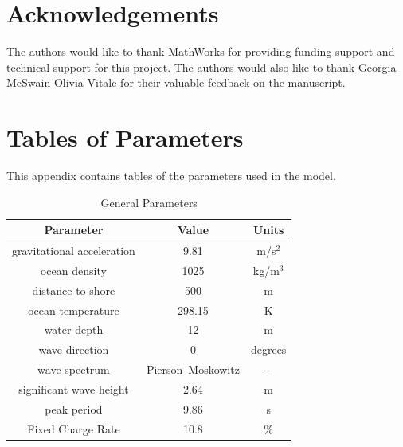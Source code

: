 \documentclass[a4paper,12pt]{elsarticle}
\begin{document}
\section*{Acknowledgements}
The authors would like to thank MathWorks for providing funding support and technical support for this project. The authors would also like to thank Georgia McSwain Olivia Vitale for their valuable feedback on the manuscript.

 
                

\appendix
\newpage
\section{Tables of Parameters} \label{app:params}

This appendix contains tables of the parameters used in the model.

\begin{table}[h]
    \centering
    \caption{General Parameters}
    \begin{tabular}{ccc}
        \hline
        \textbf{Parameter} & \textbf{Value} & \textbf{Units} \\
        \hline
        gravitational acceleration & 9.81 & m/s$^2$ \\
        ocean density & 1025 & kg/m$^3$ \\
        distance to shore & 500 & m \\
        ocean temperature & 298.15 & K \\
        water depth & 12 & m \\
        wave direction & 0 \cite{Yu2018} & degrees \\
        
        wave spectrum & Pierson–Moskowitz \cite{Yu2018} & -  \\
        significant wave height & 2.64 \cite{Yu2018} & m \\
        peak period & 9.86 \cite{Yu2018} & s \\

        Fixed Charge Rate & 10.8 \cite{LCOE_DOE} & \% \\
        \hline
    \end{tabular}
    \label{tab:paramsgeneral}
\end{table}
\end{document}
